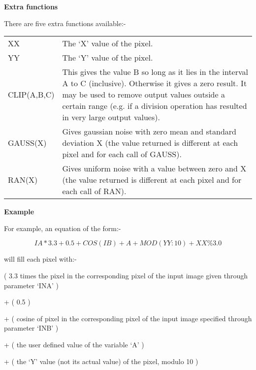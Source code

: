 \begin{small}
{{{\hspace*{4ex} \bf  Extra functions}

 There are five extra functions available:-

\begin{tabular}{|l|p{4.5in}|}\hline
    XX          & The `X' value of the pixel. \\
    YY          & The `Y' value of the pixel. \\
    CLIP(A,B,C) & This gives the value B so long as it lies in the
                  interval A to C (inclusive). Otherwise it gives a
                  zero result. It may be used to remove output values
                  outside a certain range (e.g. if a division operation
                  has resulted in very large output values). \\
    GAUSS(X)    & Gives gaussian noise with zero mean and standard
                  deviation X (the value returned is different at each
                  pixel and for each call of GAUSS). \\
    RAN(X)      & Gives uniform noise with a value between zero and X
                  (the value returned is different at each pixel and
                  for each call of RAN). \\
\hline\end{tabular}

{\hspace*{4ex} \bf  Example}


  For example, an equation of the form:-

        $$  IA*3.3 + 0.5 + COS(IB) + A + MOD(YY:10) + XX\%3.0 $$

  will fill each pixel with:- \newline

( 3.3 times the pixel in the corresponding pixel of the input image
        given through parameter `INA' ) \newline

+ ( 0.5 ) \newline

+ ( cosine of pixel in the corresponding pixel of the input image
        specified through parameter `INB' ) \newline

+ ( the user defined value of the variable `A' ) \newline

+ ( the `Y' value (not its actual value) of the pixel, modulo 10 ) \newline

}}
\end{small}
